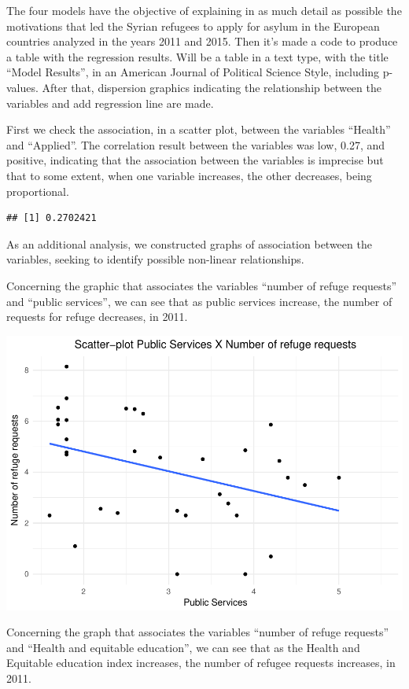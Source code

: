 \documentclass[]{elsarticle} %
\makeatletter
\def\maxwidth{\ifdim\Gin@nat@width>\linewidth\linewidth
\else\Gin@nat@width\fi}
\let\Oldincludegraphics\includegraphics
\renewcommand{\includegraphics}[1]{\Oldincludegraphics[width=\maxwidth]{#1}}
\makeatother
\begin{document}
The four models have the objective of explaining in as much detail as
possible the motivations that led the Syrian refugees to apply for
asylum in the European countries analyzed in the years 2011 and 2015.
Then it's made a code to produce a table with the regression results.
Will be a table in a text type, with the title ``Model Results'', in an
American Journal of Political Science Style, including p-values. After
that, dispersion graphics indicating the relationship between the
variables and add regression line are made.

First we check the association, in a scatter plot, between the variables
``Health'' and ``Applied''. The correlation result between the variables
was low, 0.27, and positive, indicating that the association between the
variables is imprecise but that to some extent, when one variable
increases, the other decreases, being proportional.

\begin{verbatim}
## [1] 0.2702421
\end{verbatim}

As an additional analysis, we constructed graphs of association between
the variables, seeking to identify possible non-linear relationships.

Concerning the graphic that associates the variables ``number of refuge
requests'' and ``public services'', we can see that as public services
increase, the number of requests for refuge decreases, in 2011.

\includegraphics{refugees-stephanie_files/figure-latex/model_1_1-1.pdf}

Concerning the graph that associates the variables ``number of refuge
requests'' and ``Health and equitable education'', we can see that as
the Health and Equitable education index increases, the number of
refugee requests increases, in 2011.
\end{document}
